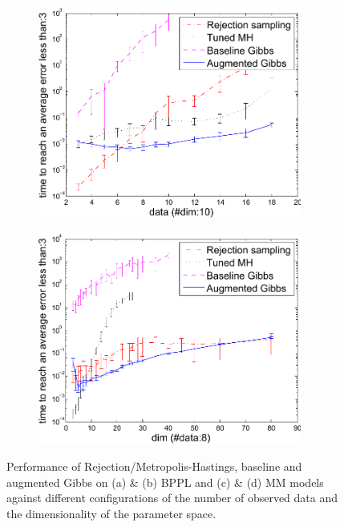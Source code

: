 \begin{figure}[thb!]
%
\centering
\begin{subfigure}{.42\textwidth}
  \centering
  \includegraphics[width=0.95\textwidth]{plot/mmm_data_analysis2.pdf}
  \caption{}
  \label{fig:mmm_data_analysis}
\end{subfigure}
\begin{subfigure}{.42\textwidth}
  \centering
  \hspace{5mm} \includegraphics[width=0.95\textwidth]{plot/mmm_dim_analysis10.pdf}
  \caption{}
  \label{fig:mmm_dim_analysis}
\end{subfigure}
\caption{Performance of Rejection/Metropolis-Hastings, baseline and augmented Gibbs on (a) \& (b) BPPL and (c) \& (d) MM models against different configurations of the number of observed data and the dimensionality of the parameter space.}
\label{fig:results}
\end{figure}

